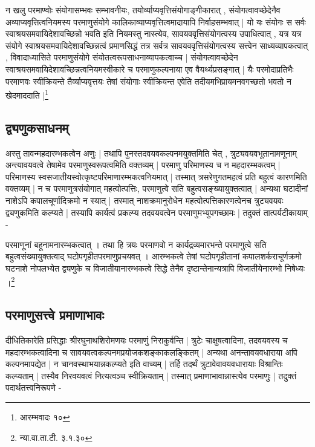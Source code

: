 {\fontsize{11.7}{0}\selectfont\s न खलु परमाण्वोः संयोगासम्भवः सम्भावनीयः, तयोर्व्याप्यवृत्तिसंयोगाङ्गीकारात् , संयोगत्वावच्छेदेनैव अव्याप्यवृत्तित्वनियमस्य परमाणुसंयोगे कालिकाव्याप्यवृत्तित्वमादायापि निर्वाहसम्भवात् | यो यः संयोगः स सर्वः स्वाश्रयसमवायिदेशावच्छिन्नो भवति इति नियमस्तु नास्त्येव, सावयववृत्तिसंयोगत्वस्य उपाधित्वात् , यत्र यत्र संयोगे स्वाश्रयसमवायिदेशावच्छिन्नत्वं प्रमाणसिद्धं तत्र सर्वत्र सावयववृत्तिसंयोगत्वस्य सत्त्वेन साध्यव्यापकत्वात् , विवादाध्यासिते परमाणुसंयोगे संयोतत्वरूपसाधनाव्यापकत्वाच्च | संयोगत्वावच्छेदेन स्वाश्रयसमवायिदेशावच्छिन्नत्वनियमस्वीकारे च परमाणुकल्पनाया एव वैयर्थ्यप्रसङ्गात् | यैः परमोदाप्रतिभैः परमाणवः स्वीक्रियन्ते तैर्व्याप्यवृत्तयः तेषां संयोगाः स्वीक्रियन्त एवेति तदीयमभिप्रायमनवगच्छतो भवतो न खेदमाददाति |\footnote{आरम्भवादः १०}}

\subsection{द्व्यणुकसाधनम्}

अस्तु तावन्महदारम्भकत्वेन अणुः | तथापि पुनस्तदवयवकल्पनमयुक्तमिति चेत् , त्रुट्यवयवभूतानामणूनाम् अन्त्यावयवत्वे तेषामेव परमाणुस्वरूपत्वमिति वक्तव्यम् | परमाणु परिमाणस्य च न महदारम्भकत्वम् | परिमाणस्य स्वसजातीयस्वोत्कृष्टपरिमाणारम्भकत्वनियमात् | तस्मात् त्रसरेणुगतमहत्वं प्रति बहुत्वं कारणमिति वक्तव्यम् | न च परमाणुत्रसंयोगात् महत्वोत्पत्तिः, परमाणुत्वे सति बहुत्वसङ्ख्यायुक्तत्वात् | अन्यथा घटादीनां नाशेऽपि कपालचूर्णादिक्रमो न स्यात् | तस्मात् नाशक्रमानुरोधेन महत्वोत्पत्तिकारणत्वेनच त्रुट्यवयवः द्व्यणुकमिति कल्प्यते | तस्यापि कार्यत्वं प्रकल्प्य तदवयवत्वेन परमाणुमभ्युपगच्छामः | तदुक्तं तात्पर्यटीकायाम् - 

{\fontsize{11.7}{0}\selectfont\s परमाणूनां बहूनामनारम्भकत्वात् । तथा हि त्रयः परमाणवो न कार्यद्रव्यमारभन्ते परमाणुत्वे सति बहुत्वसंख्यायुक्तत्वाद् घटोपगृहीतपरमाणुप्रचयवत् । आरम्भकत्वे तेषां घटोपगृहीतानां कपालशर्कराचूर्णक्रमो घटनाशे नोपलभ्येत द्व्यणुके च विजातीयानारम्भकत्वे सिद्धे तेनैव दृष्टान्तेनान्यत्रापि विजातीयेनारम्भो निषेध्यः ।\footnote{न्या.वा.ता.टी. ३.१.३०}}



\subsection{परमाणुसत्त्वे प्रमाणाभावः}

दीधितिकारेति प्रसिद्धाः श्रीरघुनाथशिरोमणयः परमाणुं निराकुर्वन्ति | त्रुटेः चाक्षुषत्वादिना, तदवयवस्य च महदारम्भकत्वादिना च सावयवत्वकल्पनमप्रयोजकशङ्काकलङ्कितम् | अन्यथा अनन्तावयवधाराया अपि कल्पनमापद्येत | न चानवस्थाभयान्नकल्प्यते इति वाच्यम् | तर्हि तदर्थं त्रुटावेवावयवधारायाः विश्रान्तिः कल्प्यताम् | तस्यैव निरवयवत्वं नित्यत्वञ्च स्वीक्रियताम् | तस्मात् प्रमाणाभावान्नास्त्येव परमाणुः | तदुक्तं पदार्थतत्त्वनिरूपणे - 

